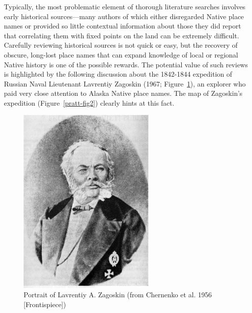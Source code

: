 Typically, the most problematic element of thorough literature searches involves early historical sources—many authors of which either disregarded Native place names or provided so little contextual information about those they did report that correlating them with fixed points on the land can be extremely difficult. Carefully reviewing historical sources is not quick or easy, but the recovery of obscure, long-lost place names that can expand knowledge of local or regional Native history is one of the possible rewards. The potential value of such reviews is highlighted by the following discussion about the 1842-1844 expedition of Russian Naval Lieutenant Lavrentiy Zagoskin (1967; Figure~\ref{pratt-fig1}), an explorer who paid very close attention to Alaska Native place names. The map of Zagoskin’s expedition (Figure~\ref{pratt-fig2}) clearly hints at this fact.

\begin{figure}[ht]
    \centering
    \includegraphics[width=0.6\textwidth]{figures/pratt-fig1}
    \caption{Portrait of Lavrentiy A. Zagoskin (from Chernenko et al. 1956 [Frontispiece])}
    \label{pratt-fig1}
\end{figure}

    
